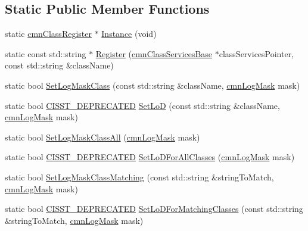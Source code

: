 \subsection*{Static Public Member Functions}
\begin{DoxyCompactItemize}
\item 
static \hyperlink{classcmn_class_register}{cmn\-Class\-Register} $\ast$ \hyperlink{classcmn_class_register_a086f22c4834c690b93f24704d4cfd936}{Instance} (void)
\item 
static const std\-::string $\ast$ \hyperlink{classcmn_class_register_ac4d2419b95d57656282fcc33dad76f31}{Register} (\hyperlink{classcmn_class_services_base}{cmn\-Class\-Services\-Base} $\ast$class\-Services\-Pointer, const std\-::string \&class\-Name)
\item 
static bool \hyperlink{classcmn_class_register_a9bbfe2c4a0d388c508d3db7e5ce87375}{Set\-Log\-Mask\-Class} (const std\-::string \&class\-Name, \hyperlink{cmn_log_lo_d_8h_a44b6ef7560b0d204460b0a54f1a5d702}{cmn\-Log\-Mask} mask)
\item 
static bool \hyperlink{cmn_portability_8h_a63da7164735f9501be651b1f2bbc0121}{C\-I\-S\-S\-T\-\_\-\-D\-E\-P\-R\-E\-C\-A\-T\-E\-D} \hyperlink{classcmn_class_register_ad2190c286fb8d1b52d7b2a8483df1551}{Set\-Lo\-D} (const std\-::string \&class\-Name, \hyperlink{cmn_log_lo_d_8h_a44b6ef7560b0d204460b0a54f1a5d702}{cmn\-Log\-Mask} mask)
\item 
static bool \hyperlink{classcmn_class_register_ab84a1a900a54b94c4c6d512acf152ebe}{Set\-Log\-Mask\-Class\-All} (\hyperlink{cmn_log_lo_d_8h_a44b6ef7560b0d204460b0a54f1a5d702}{cmn\-Log\-Mask} mask)
\item 
static bool \hyperlink{cmn_portability_8h_a63da7164735f9501be651b1f2bbc0121}{C\-I\-S\-S\-T\-\_\-\-D\-E\-P\-R\-E\-C\-A\-T\-E\-D} \hyperlink{classcmn_class_register_aa6781144fc60198e69ecd54afdc02afd}{Set\-Lo\-D\-For\-All\-Classes} (\hyperlink{cmn_log_lo_d_8h_a44b6ef7560b0d204460b0a54f1a5d702}{cmn\-Log\-Mask} mask)
\item 
static bool \hyperlink{classcmn_class_register_afc0d014a73ac6cdbc8f3f9b490cafcd9}{Set\-Log\-Mask\-Class\-Matching} (const std\-::string \&string\-To\-Match, \hyperlink{cmn_log_lo_d_8h_a44b6ef7560b0d204460b0a54f1a5d702}{cmn\-Log\-Mask} mask)
\item 
static bool \hyperlink{cmn_portability_8h_a63da7164735f9501be651b1f2bbc0121}{C\-I\-S\-S\-T\-\_\-\-D\-E\-P\-R\-E\-C\-A\-T\-E\-D} \hyperlink{classcmn_class_register_a1b46cd31e03253c910612c6d73eb5d60}{Set\-Lo\-D\-For\-Matching\-Classes} (const std\-::string \&string\-To\-Match, \hyperlink{cmn_log_lo_d_8h_a44b6ef7560b0d204460b0a54f1a5d702}{cmn\-Log\-Mask} mask)

\end{DoxyCompactItemize}
